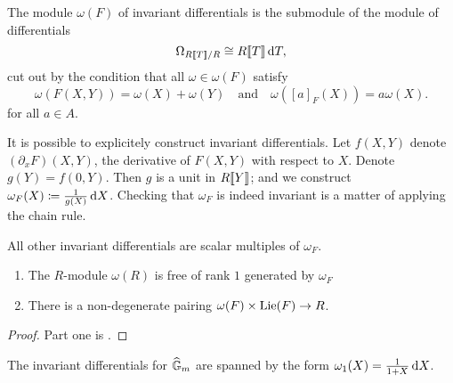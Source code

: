 \begin{defi}
  The module $\omega(F)$ of invariant differentials is the submodule of the module of 
  differentials
  \begin{equation*}
    \Omega_{R\llbracket T \rrbracket/R} \cong R\llbracket T \rrbracket \, \mathrm{d} T,
  \end{equation*}
  cut out by the condition that all $\omega \in \omega(F)$ satisfy 
  \begin{equation}\label{eq:diffcond}
    \omega(F(X,Y)) = \omega(X) + \omega(Y)\quad \text{and} \quad \omega([a]_F(X)) = a\omega(X).
  \end{equation} 
  for all $a \in A$. 
\end{defi}

It is possible to explicitely construct invariant differentials. Let $f(X,Y)$ denote
$(\partial_x F)(X,Y)$, the derivative of $F(X,Y)$ with respect to $X$. Denote
$g(Y) = f(0,Y)$. Then $g$ is a unit in $R\llbracket Y \rrbracket$; and we construct
$\omega_F(X) \coloneqq \frac 1{g(X)} \, \mathrm{d} X$. Checking that $\omega_F$ is indeed
invariant is a matter of applying the chain rule.

All other invariant differentials are scalar multiples of $\omega_F$. 
\begin{prop}
  \begin{enumerate}
    \item The $R$-module $\omega(R)$ is free of rank $1$ generated by $\omega_F$ 
    \item There is a non-degenerate pairing $\omega(F) \times \operatorname{Lie}(F) \to R$.
  \end{enumerate}
\begin{proof}
  Part one is \cite[Proposition 2.2]{hopkins1994equivariant}. 
\end{proof}
\end{prop}

\begin{xpl}
  The invariant differentials for $\widehat{\mathbb{G}}_m$ are spanned by the form 
  $\omega_1(X) = \frac 1{1+X} \, \mathrm{d} X$. 
\end{xpl}

